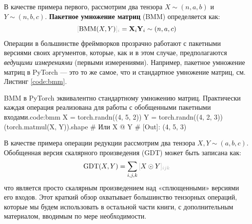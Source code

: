 В качестве примера первого, рассмотрим два тензора $X \sim (n,a,b)$ и $Y\sim (n,b,c)$. \textbf{Пакетное умножение матриц} (BMM) определяется как:
%
\begin{equation}
\idx{\text{BMM}(X,Y)}{i} = {\mathbf{X}}_{i}{\mathbf{Y}}_{i} \sim (n, a, c)
\label{eq:bmm}
\end{equation}
%
Операции в большинстве фреймворков прозрачно работают с пакетными версиями своих аргументов, которые, как и в этом случае, предполагаются \textit{ведущими измерениями} (первыми измерениями). Например, пакетное умножение матриц в PyTorch — это то же самое, что и стандартное умножение матриц, см. Листинг \ref{code:bmm}.

\begin{mypy}{BMM в PyTorch эквивалентно стандартному умножению матриц. Практически каждая операция реализована для работы с обобщенными пакетными входами.}{code:bmm}
X = torch.randn((4, 5, 2))
Y = torch.randn((4, 2, 3))
(torch.matmul(X, Y)).shape # Или X @ Y 
# [Out]: (4, 5, 3)
\end{mypy}
%
В качестве примера операции редукции рассмотрим два тензора $X, Y \sim (a,b,c)$. Обобщенная версия скалярного произведения (GDT) может быть записана как:
%
$$
\text{GDT}(X,Y) =\sum_{i,j,k} \idx{X \odot Y}{ijk}
$$
%
что является просто скалярным произведением над «сплющенными» версиями его входов. Этот краткий обзор охватывает большинство тензорных операций, которые мы будем использовать в остальной части книги, с дополнительным материалом, вводимым по мере необходимости.
%
